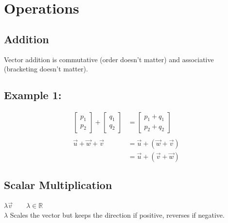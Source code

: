 \documentclass[a4paper,12pt]{article}
\begin{document}
\section*{Operations}
\subsection*{Addition}
Vector addition is commutative (order doesn't matter) and associative (bracketing doesn't matter).
\subsection*{Example 1:}
\begin{align*}
\begin{bmatrix} p_1 \\ p_2 \end{bmatrix} + 
\begin{bmatrix} q_1 \\ q_2 \end{bmatrix} &= 
\begin{bmatrix} p_1 + q_1 \\ p_2 + q_2 \end{bmatrix} \\\\
\vec{u} + \vec{w} + \vec{v} & = \vec{u} + ( \vec{w} + \vec{v} ) \\
		  & = \vec{u} + ( \vec{v} + \vec{w} )
\end{align*}
\subsection*{Scalar Multiplication}
$ \lambda \vec{v} \qquad \lambda \in \mathbb{R}$\\
$\lambda$ Scales the vector but keeps the direction if positive, reverses if negative.\\
\end{document}
